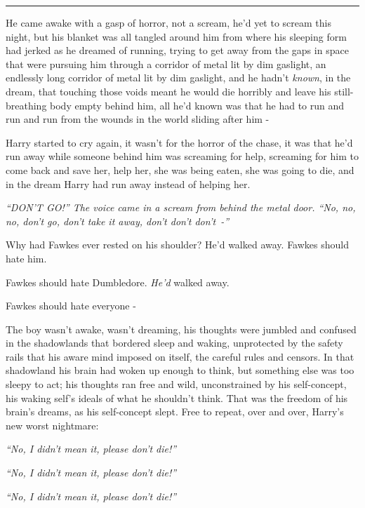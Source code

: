 \begin{center}\rule{3in}{0.4pt}\end{center}

He came awake with a gasp of horror, not a scream, he'd yet to scream this night, but his blanket was all tangled around him from where his sleeping form had jerked as he dreamed of running, trying to get away from the gaps in space that were pursuing him through a corridor of metal lit by dim gaslight, an endlessly long corridor of metal lit by dim gaslight, and he hadn't \emph{known}, in the dream, that touching those voids meant he would die horribly and leave his still-breathing body empty behind him, all he'd known was that he had to run and run and run from the wounds in the world sliding after him -

Harry started to cry again, it wasn't for the horror of the chase, it was that he'd run away while someone behind him was screaming for help, screaming for him to come back and save her, help her, she was being eaten, she was going to die, and in the dream Harry had run away instead of helping her.

\emph{``DON'T GO!'' The voice came in a scream from behind the metal door. ``No, no, no, don't go, don't take it away, don't don't don't~-''}

Why had Fawkes ever rested on his shoulder? He'd walked away. Fawkes should hate him.

Fawkes should hate Dumbledore. \emph{He'd} walked away.

Fawkes should hate everyone -

The boy wasn't awake, wasn't dreaming, his thoughts were jumbled and confused in the shadowlands that bordered sleep and waking, unprotected by the safety rails that his aware mind imposed on itself, the careful rules and censors. In that shadowland his brain had woken up enough to think, but something else was too sleepy to act; his thoughts ran free and wild, unconstrained by his self-concept, his waking self's ideals of what he shouldn't think. That was the freedom of his brain's dreams, as his self-concept slept. Free to repeat, over and over, Harry's new worst nightmare:

\emph{``No, I didn't mean it, please don't die!''}

\emph{``No, I didn't mean it, please don't die!''}

\emph{``No, I didn't mean it, please don't die!''}

